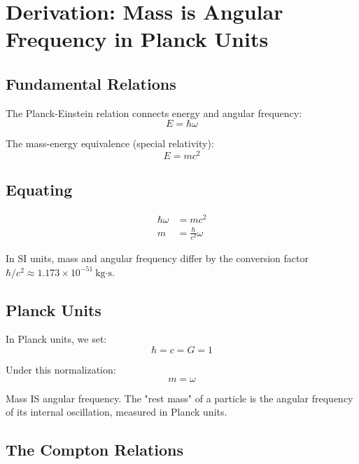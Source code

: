 \documentclass{article}
\begin{document}
\section{Derivation: Mass is Angular Frequency in Planck Units}

\subsection{Fundamental Relations}

The Planck-Einstein relation connects energy and angular frequency:
\begin{equation}
E = \hbar \omega
\end{equation}

The mass-energy equivalence (special relativity):
\begin{equation}
E = m c^2
\end{equation}

\subsection{Equating}

\begin{align}
\hbar \omega &= m c^2 \\
m &= \frac{\hbar}{c^2} \omega
\end{align}

In SI units, mass and angular frequency differ by the conversion factor
$\hbar/c^2 \approx 1.173 \times 10^{-51}\ \text{kg·s}$.

\subsection{Planck Units}

In Planck units, we set:
\begin{equation}
\hbar = c = G = 1
\end{equation}

Under this normalization:
\begin{equation}
\boxed{m = \omega}
\end{equation}

Mass IS angular frequency. The "rest mass" of a particle is the
angular frequency of its internal oscillation, measured in Planck units.

\subsection{The Compton Relations}
\end{document}
